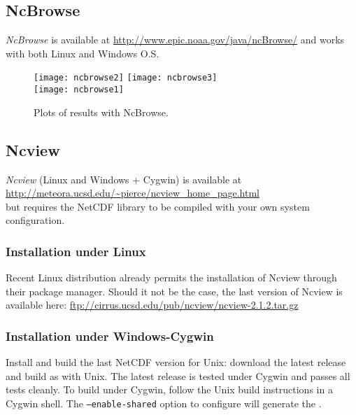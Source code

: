 \subsection{NcBrowse}

\textsl{NcBrowse} is available at \url{http://www.epic.noaa.gov/java/ncBrowse/} and works with both Linux and Windows O.S.

\begin{figure}[htpb]
\centering
\texttt{[image: ncbrowse2]}\hspace{.5cm} \texttt{[image: ncbrowse3]} \\
\vspace{.5cm}
\texttt{[image: ncbrowse1]} 
\caption{Plots of results with NcBrowse.}
\end{figure}

\subsection{Ncview}

\textsl{Ncview} (Linux and Windows + Cygwin) is available at\\
\url{http://meteora.ucsd.edu/~pierce/ncview_home_page.html}\\
but requires the NetCDF library to be compiled with your own system configuration.

\subsubsection{Installation under Linux}

Recent Linux distribution already permits the installation of Ncview through their package manager. Should it not be the case, the last version of Ncview is available here: \url{ftp://cirrus.ucsd.edu/pub/ncview/ncview-2.1.2.tar.gz}

\subsubsection{Installation under Windows-Cygwin}

Install and build the last NetCDF version for Unix: download the latest release and build as with Unix. The latest release is tested under Cygwin and passes all tests cleanly. To build under Cygwin, follow the Unix build instructions in a Cygwin shell. The \texttt{--enable-shared} option to configure will generate the . 


